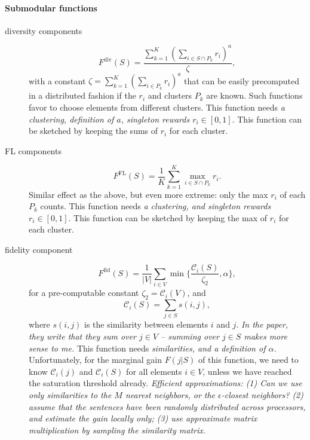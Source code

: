 \documentclass{article}
\newcommand{\inter}{\cap}
\begin{document}
\paragraph{Submodular functions}
\begin{description}
\item[diversity components]
  \begin{equation}
    \label{eq:6}
    F^{\text{div}}(S) = \frac{\sum_{k=1}^K(\sum_{i \in S \inter P_k}r_i)^a}{\zeta},
  \end{equation}
  with a constant $\zeta = \sum_{k=1}^K(\sum_{i \in P_k}r_i)^a$ that can be easily precomputed in a distributed fashion if the $r_i$ and clusters $P_k$ are known. Such functions favor to choose elements from different clusters.
  This function needs \emph{a clustering, definition of $a$, singleton rewards $r_i \in [0,1]$}. This function can be sketched by keeping the sums of $r_i$ for each cluster.
\item[FL components]
  \begin{equation}
    \label{eq:7}
    F^{\text{FL}}(S) = \frac{1}{K}\sum_{k=1}^K \max_{i \in S \inter P_k} r_i.
  \end{equation}
  Similar effect as the above, but even more extreme: only the max $r_i$ of each $P_k$ counts.
  This function needs \emph{a clustering, and  singleton rewards $r_i \in [0,1]$}.
  This function can be sketched by keeping the max of $r_i$ for each cluster.
\item[fidelity component]
  \begin{equation}
    \label{eq:8}
    F^{\text{fid}}(S) = \frac{1}{|V|} \sum_{i \in V} \min\{ \frac{\mathcal{C}_i(S)}{\zeta_2}, \alpha \},
  \end{equation}
  for a pre-computable constant $\zeta_2 = \mathcal{C}_i(V)$, and
  \begin{equation}
    \label{eq:5}
    \mathcal{C}_i(S) = \sum_{j \in S} s(i,j),
  \end{equation}
  where $s(i,j)$ is the similarity between elements $i$ and $j$. \emph{In the paper, they write that they sum over $j \in V$ -- summing over $j \in S$ makes more sense to me.} This function needs \emph{similarities, and a definition of $\alpha$.}
  Unfortunately, for the marginal gain $F(j | S)$ of this function, we need to know $\mathcal{C}_i(j)$ and $\mathcal{C}_i(S)$ for all elements $i \in V$, unless we have reached the saturation threshold already. \emph{Efficient approximations: (1) Can we use only similarities to the $M$ nearest neighbors, or the $\epsilon$-closest neighbors? (2) assume that the sentences have been randomly distributed across processors, and estimate the gain locally only; (3) use approximate matrix multiplication by sampling the similarity matrix.}
\end{description}
\end{document}
